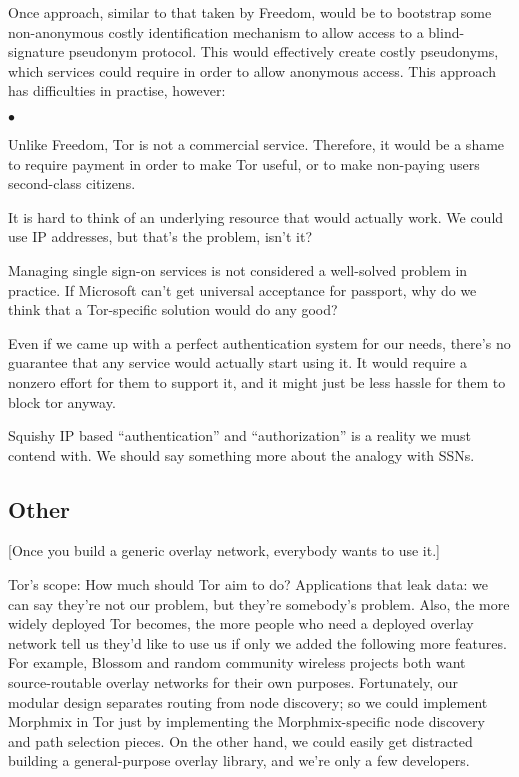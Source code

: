 \documentclass{llncs}
\newenvironment{tightlist}{\begin{list}{$\bullet$}{
  \setlength{\itemsep}{0mm}
    \setlength{\parsep}{0mm}
    }}{\end{list}}
\begin{document}
Once approach, similar to that taken by Freedom, would be to bootstrap some
non-anonymous costly identification mechanism to allow access to a
blind-signature pseudonym protocol.  This would effectively create costly
pseudonyms, which services could require in order to allow anonymous access.
This approach has difficulties in practise, however:
\begin{tightlist}
\item Unlike Freedom, Tor is not a commercial service.  Therefore, it would
  be a shame to require payment in order to make Tor useful, or to make
  non-paying users second-class citizens.
\item It is hard to think of an underlying resource that would actually work.
  We could use IP addresses, but that's the problem, isn't it?
\item Managing single sign-on services is not considered a well-solved
  problem in practice.  If Microsoft can't get universal acceptance for
  passport, why do we think that a Tor-specific solution would do any good?
\item Even if we came up with a perfect authentication system for our needs,
  there's no guarantee that any service would actually start using it.  It
  would require a nonzero effort for them to support it, and it might just
  be less hassle for them to block tor anyway.
\end{tightlist}

Squishy IP based ``authentication'' and ``authorization'' is a reality
we must contend with. We should say something more about the analogy
with SSNs.



\subsection{Other}

[Once you build a generic overlay network, everybody wants to use it.]

Tor's scope: How much should Tor aim to do? Applications that leak
data: we can say they're not our problem, but they're somebody's problem.
Also, the more widely deployed Tor becomes, the more people who need a
deployed overlay network tell us they'd like to use us if only we added
the following more features. For example, Blossom \cite{blossom} and
random community wireless projects both want source-routable overlay
networks for their own purposes. Fortunately, our modular design separates
routing from node discovery; so we could implement Morphmix in Tor just
by implementing the Morphmix-specific node discovery and path selection
pieces. On the other hand, we could easily get distracted building a
general-purpose overlay library, and we're only a few developers.
\end{document}
